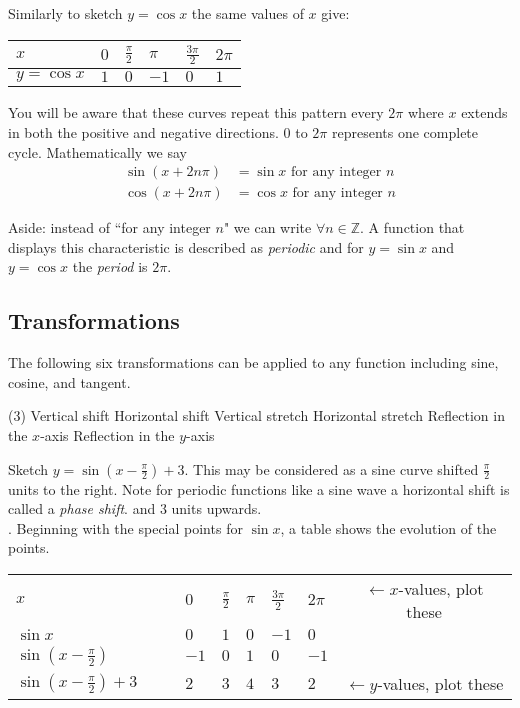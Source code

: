 Similarly to sketch $y =\cos x$ the same values of $x$ give: 


\begin{tabular}[c]{|l|l|l|l|l|l|}\hline
	$x$  & $0$  & $\frac{\pi }{2}$  & $\pi $  & $\frac{3 \pi }{2}$  & $2 \pi $  \\
	\hline
	$y =\cos  x$  & $1$  & $0$  & $ -1$  & $0$  & $1$  \\
	\hline
\end{tabular}

You will be aware that these curves repeat this pattern every $2 \pi $ where $x$ extends in both the positive and negative directions. $0$ to $2\pi $ represents one complete cycle. Mathematically we say
\begin{align*}\sin  \left (x +2 n \pi \right ) &  = \sin  x\text{\  for any integer }n \\
	\cos  \left (x +2 n \pi \right ) &  = \cos  x\text{\  for any integer }n\end{align*}

Aside: instead of ``for any integer $n$" we can write $ \forall n \in \mathbb{Z}$. A function that displays this characteristic is described as \emph{periodic} and for $y =\sin x$ and $y =\cos x$ the \emph{period} is $2 \pi $. 

\subsection*{Transformations}
The following six transformations can be applied to any function including sine, cosine, and tangent. 
\begin{tasks}[style=itemize](3)
\task Vertical shift 
\task Horizontal shift 
\task Vertical stretch 
\task Horizontal stretch 
\task Reflection in the $x$-axis 
\task Reflection in the $y$-axis 
\end{tasks}

\example Sketch $y =\sin  \left (x -\frac{\pi }{2}\right ) +3$. This may be considered as a sine curve shifted $\frac{\pi }{2}$ units to the right. Note for periodic functions like a sine wave a horizontal shift is called a \textit{phase shift}. and $3$ units upwards.\\ 
. Beginning with the special points for $\sin x$, a table shows the evolution of the points. \\
\begin{tabular}{llllllc}\cmidrule{1-6}
	$x$  & $0$  & $\frac{\pi }{2}$  & $\pi $  & $\frac{3 \pi }{2}$  & $2 \pi $ & $\leftarrow x$-values, plot these \\
	\cmidrule{1-6}
	$\sin  x$  & $0$  & $1$  & $0$  & $ -1$  & $0$ & \\
	\cmidrule{1-6}
	$\sin  \left (x -\frac{\pi }{2}\right )$  & $ -1$  & $0$  & $1$  & $0$  & $ -1$&  \\
	\cmidrule{1-6}
	$\sin  \left (x -\frac{\pi }{2}\right ) +3\qquad$  & $2$  & $3$  & $4$  & $3$  & $2$&$\leftarrow y$-values, plot these  \\
	\cmidrule{1-6}
\end{tabular}

